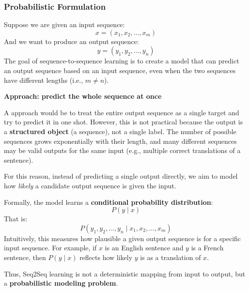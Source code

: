 \subsubsection{Probabilistic Formulation}

Suppose we are given an input sequence:
\begin{equation*}
    x = \left(x_1, x_2, \dots, x_m\right)
\end{equation*}
And we want to produce an output sequence:
\begin{equation*}
    y = \left(y_1, y_2, \dots, y_n\right)
\end{equation*}
The goal of sequence-to-sequence learning is to create a model that can predict an output sequence based on an input sequence, even when the two sequences have different lengths (i.e., $m \neq n$).

\highspace
\begin{flushleft}
    \textcolor{Red2}{ \textbf{\Naive Approach: predict the whole sequence at once}}
\end{flushleft}
A \naive approach would be to treat the entire output sequence as a single target and try to predict it in one shot. However, this is not practical because the output is a \textbf{structured object} (a sequence), not a single label. The number of possible sequences grows exponentially with their length, and many different sequences may be valid outputs for the same input (e.g., multiple correct translations of a sentence).

\highspace
For this reason, instead of predicting a single output directly, we aim to model how \emph{likely} a candidate output sequence is given the input.

\highspace
Formally, the model learns a \textbf{conditional probability distribution}:
\begin{equation}
    P\left(y \mid x\right)
\end{equation}
That is:
\begin{equation*}
    P\left(y_1, y_2, \dots, y_n \mid x_1, x_2, \dots, x_m\right)
\end{equation*}
Intuitively, this measures how plausible a given output sequence is for a specific input sequence. For example, if $x$ is an English sentence and $y$ is a French sentence, then $P\left(y \mid x\right)$ reflects how likely $y$ is as a translation of $x$.

\highspace
Thus, Seq2Seq learning is not a deterministic mapping from input to output, but a \textbf{probabilistic modeling problem}.

